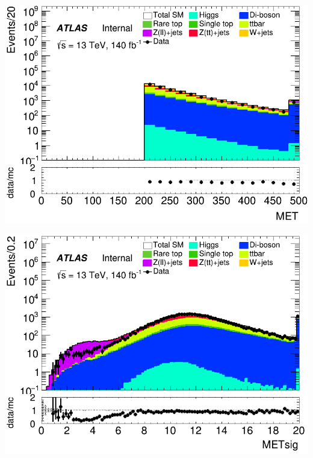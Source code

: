 \documentclass[usenames,dvipsnames]{beamer}
\begin{document}
\begin{frame}
    \vspace{0.5cm} %

    \begin{minipage}{0.32\textwidth}
        \centering
        \includegraphics[width=\textwidth]{graphics/L_met/L_met_MET.png}
    \end{minipage}
    \hfill
    \begin{minipage}{0.32\textwidth}
        \centering
        \includegraphics[width=\textwidth]{graphics/L_met/L_met_METsig.png}
    \end{minipage}
    \hfill
    

\end{frame}
\end{document}
